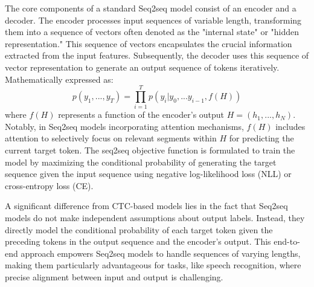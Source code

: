 The core components of a standard Seq2seq model consist of an encoder and a decoder. The encoder processes input sequences of variable length, transforming them into a sequence of vectors often denoted as the "internal state" or "hidden representation." This sequence of vectors encapsulates the crucial information extracted from the input features. Subsequently, the decoder uses this sequence of vector representation to generate an output sequence of tokens iteratively. Mathematically expressed as:
\begin{equation}
    p(y_1,...,y_T) = \prod_{i=1}^{T} p(y_i| y_0,...y_{i-1}, f(H))
\end{equation}
where $f(H)$ represents a function of the encoder's output $H = (h_1, ..., h_N)$. Notably, in Seq2seq models incorporating attention mechanisms, $f(H)$ includes attention to selectively focus on relevant segments within $H$ for predicting the current target token. The seq2seq objective function is formulated to train the model by maximizing the conditional probability of generating the target sequence given the input sequence using  negative log-likelihood  loss (NLL) or cross-entropy loss (CE).

A significant difference from CTC-based models lies in the fact that Seq2seq models do not make independent assumptions about output labels. Instead, they directly model the conditional probability of each target token given the preceding tokens in the output sequence and the encoder's output. This end-to-end approach empowers Seq2seq models to handle sequences of varying lengths, making them particularly advantageous for tasks, like speech recognition, where precise alignment between input and output is challenging.


